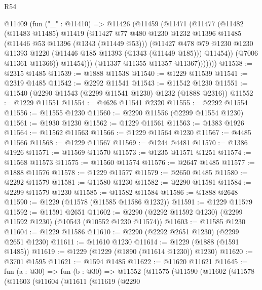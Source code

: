 \begin{lexlean}{R54}
\begin{coremodule}
            @11409
              (fun ("_" : @11410) =>
              @11426
                (@11459
                  (@11471
                    (@11477
                      (@11482
                        (@11483 @11485)
                        @11419
                        (@11427
                          @77
                          @480
                          @1230
                          @1232
                          @11396
                          @11485
                          (@11446 @53 @11396 (@1343 (@11449 @53)))
                          (@11427
                            @478
                            @79
                            @1230
                            @1230
                            @11393
                            @1220
                            (@11446 @185 @11393 (@1343 (@11449 @185)))
                            @11454))
                        (@7006 @11361 @11366))
                      @11454)))
                (@11337 @11355 @11357 @11367)))))))
@11538 := @2315 @1485
@11539 := @1888 @11538
@11540 := @1229 @11539
@11541 := @2319 @1485
@11542 := @2292 @11541
@11543 := @11542 @1230
@11551 := @11540 (@2290 @11543 (@2299 @11541 @1230) @1232 (@1888 @2316))
@11552 := @1229 @11551
@11554 := @4626 @11541 @2320
@11555 := @2292 @11554
@11556 := @11555 @1230
@11560 := @2290 @11556 (@2299 @11554 @1230)
@11561 := @1930 @1230
@11562 := @1229 @11561
@11563 := @1383 @1926
@11564 := @11562 @11563
@11566 := @1229 @11564 @1230
@11567 := @4485 @11566
@11568 := @1229 @11567
@11569 := @1244 @4481
@11570 := @1386 @1926
@11571 := @11569 @11570
@11573 := @1235 @11571 @1251
@11574 := @11568 @11573
@11575 := @11560 @11574
@11576 := @2647 @1485
@11577 := @1888 @11576
@11578 := @1229 @11577
@11579 := @2650 @1485
@11580 := @2292 @11579
@11581 := @11580 @1230
@11582 := @2290 @11581
@11584 := @2299 @11579 @1230
@11585 := @11582 @11584
@11586 := @1888 @2648
@11590 := @1229 (@11578 (@11585 @11586 @1232))
@11591 := @1229 @11579
@11592 := @11591 @2651
@11602 := @2290 (@2292 @11592 @1230) (@2299 @11592 @1230) (@10543 (@10552 @1230 @11574))
@11603 := @11585 @1230
@11604 := @1229 @11586
@11610 := @2290 (@2292 @2651 @1230) (@2299 @2651 @1230)
@11611 := @11610 @1230
@11614 := @1229 (@1888 (@1591 @1485))
@11619 := @1229 (@1229 (@1890 (@11614 @1230)) @1230)
@11620 := @3701 @1595
@11621 := @1594 @1485
@11622 := @11620 @11621
@11645 := fun (a : @30) =>
  fun (b : @30) =>
  @11552
    (@11575
      (@11590
        (@11602
          (@11578
            (@11603
              (@11604
                (@11611
                  (@11619
                    (@2290

\end{coremodule}
\end{lexlean}
